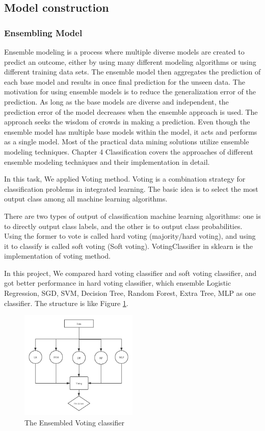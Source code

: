 \documentclass[11pt,en,cite=authoryear]{elegantpaper}
\begin{document}
\subsection{Model construction}
\subsubsection{Ensembling Model}
Ensemble modeling is a process where multiple diverse models are created to predict an outcome, either by using many different modeling algorithms or using different training data sets. The ensemble model then aggregates the prediction of each base model and results in once final prediction for the unseen data. The motivation for using ensemble models is to reduce the generalization error of the prediction. As long as the base models are diverse and independent, the prediction error of the model decreases when the ensemble approach is used. The approach seeks the wisdom of crowds in making a prediction. Even though the ensemble model has multiple base models within the model, it acts and performs as a single model. Most of the practical data mining solutions utilize ensemble modeling techniques. Chapter 4 Classification covers the approaches of different ensemble modeling techniques and their implementation in detail.

In this task, We applied Voting method. Voting is a combination strategy for classification problems in integrated learning. The basic idea is to select the most output class among all machine learning algorithms.

There are two types of output of classification machine learning algorithms: one is to directly output class labels, and the other is to output class probabilities. Using the former to vote is called hard voting (majority/hard voting), and using it to classify is called soft voting (Soft voting). VotingClassifier in sklearn is the implementation of voting method.

In this project, We compared hard voting classifier and soft voting classifier, and got better performance in hard voting classifier, which ensemble Logistic Regression, SGD, SVM, Decision Tree, Random Forest, Extra Tree, MLP as one classifier. The structure is like Figure \ref{vcl}.

\begin{figure}[h]
	\centering
	\includegraphics[width=0.5\textwidth]{image/voting}
	\caption{The Ensembled Voting classifier}
	\label{vcl}
\end{figure}
\end{document}
